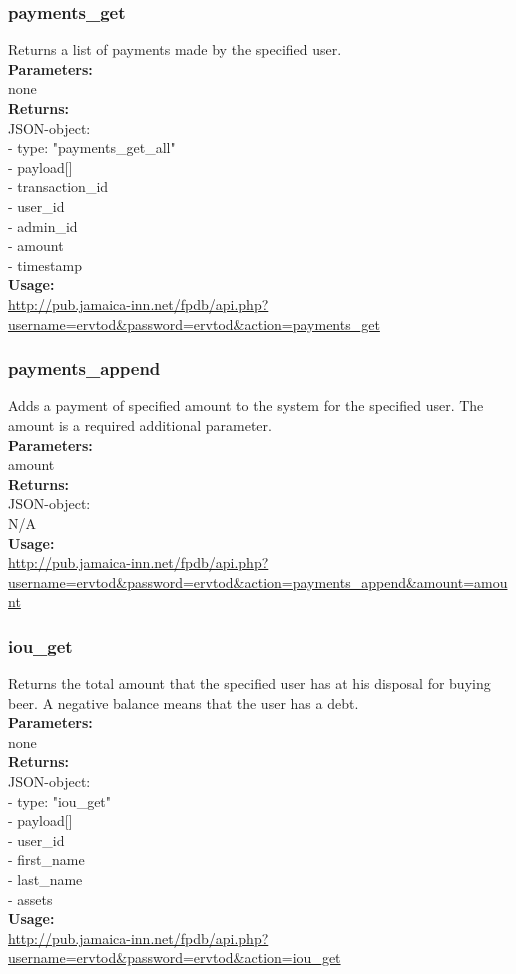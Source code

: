 \documentclass{article}
\begin{document}
\subsubsection{payments\_get}
Returns a list of payments made by the specified user.\\
\textbf{Parameters:}\\
none\\
\textbf{Returns:}\\
JSON-object:\\
- type: "payments\_get\_all"\\
- payload[]\\
\indent - transaction\_id\\
\indent - user\_id\\
\indent - admin\_id\\
\indent - amount\\
\indent - timestamp\\
\textbf{Usage:}\\
\url{http://pub.jamaica-inn.net/fpdb/api.php?username=ervtod\&password=ervtod\&action=payments\_get}\\

\subsubsection{payments\_append}
Adds a payment of specified amount to the system for the specified user. The amount is a required additional parameter.\\
\textbf{Parameters:}\\
amount\\
\textbf{Returns:}\\
JSON-object:\\
N/A\\
\textbf{Usage:}\\
\url{http://pub.jamaica-inn.net/fpdb/api.php?username=ervtod\&password=ervtod\&action=payments\_append\&amount=amount}\\

\subsubsection{iou\_get}
Returns the total amount that the specified user has at his disposal for buying beer. A negative balance means that the user has a debt.\\
\textbf{Parameters:}\\
none\\
\textbf{Returns:}\\
JSON-object:\\
- type: "iou\_get"\\
- payload[]\\
\indent - user\_id\\
\indent - first\_name\\
\indent - last\_name\\
\indent - assets\\
\textbf{Usage:}\\
\url{http://pub.jamaica-inn.net/fpdb/api.php?username=ervtod\&password=ervtod\&action=iou\_get}\\
 
\end{document}
